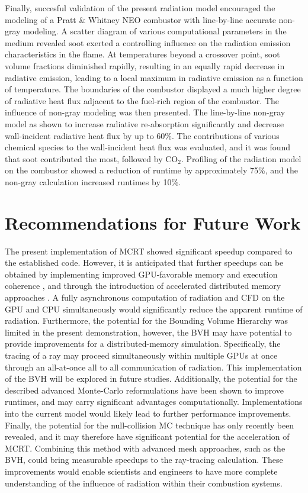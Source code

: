 Finally, succesful validation of the present radiation model encouraged the modeling of a Pratt \& Whitney NEO combustor with line-by-line accurate non-gray modeling. A scatter diagram of various computational parameters in the medium revealed soot exerted a controlling influence on the radiation emission characteristics in the flame. At temperatures beyond a crossover point, soot volume fractions diminished rapidly, resulting in an equally rapid decrease in radiative emission, leading to a local maximum in radiative emission as a function of temperature. The boundaries of the combustor displayed a much higher degree of radiative heat flux adjacent to the fuel-rich region of the combustor. The influence of non-gray modeling was then presented. The line-by-line non-gray model as shown to increase radiative re-absorption significantly and decrease wall-incident radiative heat flux by up to $60$\%. The contributions of various chemical species to the wall-incident heat flux was evaluated, and it was found that soot contributed the most, followed by CO$_2$. 
Profiling of the radiation model on the combustor showed a reduction of runtime by approximately 75\%, and the non-gray calculation increased runtimes by 10\%.

\section{Recommendations for Future Work}
The present implementation of MCRT showed significant speedup compared to the established code. However, it is anticipated that further speedups can be obtained by implementing improved GPU-favorable memory and execution coherence \cite{Silvestri2019ASimulation}, and through the introduction of accelerated distributed memory approaches \cite{Humphrey2015ATracing}. A fully asynchronous computation of radiation and CFD on the GPU and CPU simultaneously would significantly reduce the apparent runtime of radiation. Furthermore, the potential for the Bounding Volume Hierarchy was limited in the present demonstration, however, the BVH may have potential to provide improvements for a distributed-memory simulation. Specifically, the tracing of a ray may proceed simultaneously within multiple GPUs at once through an all-at-once all to all communication of radiation. This implementation of the BVH will be explored in future studies.
Additionally, the potential for the described advanced Monte-Carlo reformulations have been shown to improve runtimes, and may carry significant advantages computationally. Implementations into the current model would likely lead to further performance improvements. Finally, the potential for the null-collision MC technique has only recently been revealed, and it may therefore have significant potential for the acceleration of MCRT. Combining this method with advanced mesh approaches, such as the BVH, could bring measurable speedups to the ray-tracing calculation.
These improvements would enable scientists and engineers to have more complete understanding of the influence of radiation within their combustion systems. 